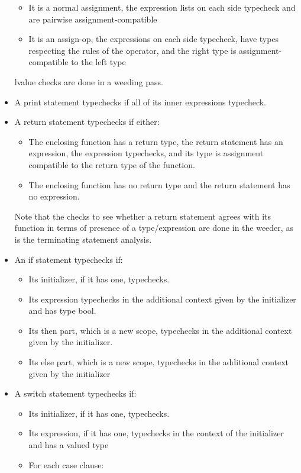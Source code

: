 \documentclass[letterpaper,11pt]{article}
\begin{document}
\begin{itemize}
	\begin{itemize}
	\item It is a normal assignment, the expression lists on each side typecheck and are pairwise assignment-compatible
	\item It is an assign-op, the expressions on each side typecheck, have types respecting the rules of the operator, and the right type is assignment-compatible to the left type
	\end{itemize}
lvalue checks are done in a weeding pass.
\item A print statement typechecks if all of its inner expressions typecheck.
\item A return statement typechecks if either:
	\begin{itemize}
	\item The enclosing function has a return type, the return statement has an expression, the expression typechecks, and its type is assignment compatible to the return type of the function.
	\item The enclosing function has no return type and the return statement has no expression.
	\end{itemize}
Note that the checks to see whether a return statement agrees with its function in terms of presence of a type/expression are done in the weeder, as is the terminating statement analysis.
\item An if statement typechecks if:
	\begin{itemize}
	\item Its initializer, if it has one, typechecks.
	\item Its expression typechecks in the additional context given by the initializer and has type bool.
	\item Its then part, which is a new scope, typechecks in the additional context given by the initializer.
	\item Its else part, which is a new scope, typechecks in the additional context given by the initializer
	\end{itemize}
\item A switch statement typechecks if:
	\begin{itemize}
	\item Its initializer, if it has one, typechecks.
	\item Its expression, if it has one, typechecks in the context of the initializer and has a valued type
	\item For each case clause:
		\begin{itemize}

\end{itemize}
\end{itemize}
\end{itemize}
\end{document}
